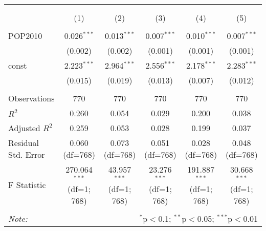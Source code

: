 \begin{table}[!htbp] \centering
\begin{tabular}{@{\extracolsep{5pt}}lccccc}
\\[-1.8ex]\hline
\hline \\[-1.8ex]
\\[-1.8ex] & (1) & (2) & (3) & (4) & (5) \\
\hline \\[-1.8ex]
 POP2010 & 0.026$^{***}$ & 0.013$^{***}$ & 0.007$^{***}$ & 0.010$^{***}$ & 0.007$^{***}$ \\
& (0.002) & (0.002) & (0.001) & (0.001) & (0.001) \\
 const & 2.223$^{***}$ & 2.964$^{***}$ & 2.556$^{***}$ & 2.178$^{***}$ & 2.283$^{***}$ \\
& (0.015) & (0.019) & (0.013) & (0.007) & (0.012) \\
\hline \\[-1.8ex]
 Observations & 770 & 770 & 770 & 770 & 770 \\
 $R^2$ & 0.260 & 0.054 & 0.029 & 0.200 & 0.038 \\
 Adjusted $R^2$ & 0.259 & 0.053 & 0.028 & 0.199 & 0.037 \\
 Residual Std. Error & 0.060 (df=768) & 0.073 (df=768) & 0.051 (df=768) & 0.028 (df=768) & 0.048 (df=768) \\
 F Statistic & 270.064$^{***}$ (df=1; 768) & 43.957$^{***}$ (df=1; 768) & 23.276$^{***}$ (df=1; 768) & 191.887$^{***}$ (df=1; 768) & 30.668$^{***}$ (df=1; 768) \\
\hline
\hline \\[-1.8ex]
\textit{Note:} & \multicolumn{5}{r}{$^{*}$p$<$0.1; $^{**}$p$<$0.05; $^{***}$p$<$0.01} \\
\end{tabular}
\end{table}